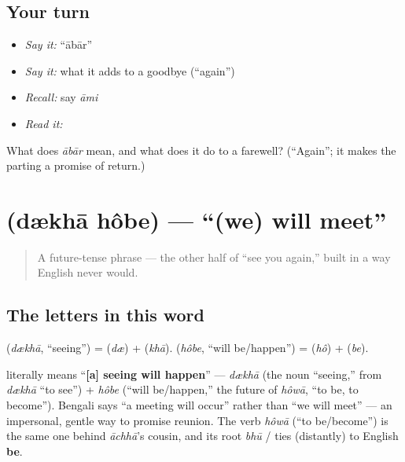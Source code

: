 \subsection*{Your turn}
\begin{itemize}
\raggedright
  \item \emph{Say it:} \textquotedblleft{}ābār\textquotedblright{}
  \item \emph{Say it:} what it adds to a goodbye (\textquotedblleft{}again\textquotedblright{})
  \item \emph{Recall:} say \emph{āmi}
  \item \emph{Read it:} \textbf{}
\end{itemize}

\begin{tcolorbox}[breakable,colback=teal!4,colframe=teal!35!black,title={Before you move on}]
What does \emph{ābār} mean, and what does it do to a farewell? (\textquotedblleft{}Again\textquotedblright{}; it makes the parting a promise of return.)
\end{tcolorbox}
\section[\texorpdfstring{\bn{দেখা} \bn{হবে} (dækhā hôbe)}{দেখা হবে (dækhā hôbe)}]{  (dækhā hôbe) — \textquotedblleft{}(we) will meet\textquotedblright{}}

\label{lesson:BN-C04-dekha-hobe}



\begin{quote}
A future-tense phrase — the other half of \textquotedblleft{}see you again,\textquotedblright{} built in a way English never would.
\end{quote}

\subsection*{The letters in this word}
\textbf{} (\emph{dækhā}, \textquotedblleft{}seeing\textquotedblright{}) = \textbf{} (\emph{dæ}) + \textbf{} (\emph{khā}). \textbf{} (\emph{hôbe}, \textquotedblleft{}will be/happen\textquotedblright{}) = \textbf{} (\emph{hô}) + \textbf{} (\emph{be}).

\begin{cousinweb}
\textbf{ } literally means \textquotedblleft{}\textbf{{[}a{]} seeing will happen}\textquotedblright{} — \emph{dækhā} (the noun \textquotedblleft{}seeing,\textquotedblright{} from \textbf{} \emph{dækhā} \textquotedblleft{}to see\textquotedblright{}) + \emph{hôbe} (\textquotedblleft{}will be/happen,\textquotedblright{} the future of \emph{hôwā}, \textquotedblleft{}to be, to become\textquotedblright{}). Bengali says \textquotedblleft{}a meeting will occur\textquotedblright{} rather than \textquotedblleft{}we will meet\textquotedblright{} — an impersonal, gentle way to promise reunion. The verb \emph{hôwā} (\textquotedblleft{}to be/become\textquotedblright{}) is the same one behind \emph{āchhā}'s cousin, and its root \emph{bhū} / \textbf{} ties (distantly) to English \textbf{be}.
\end{cousinweb}

